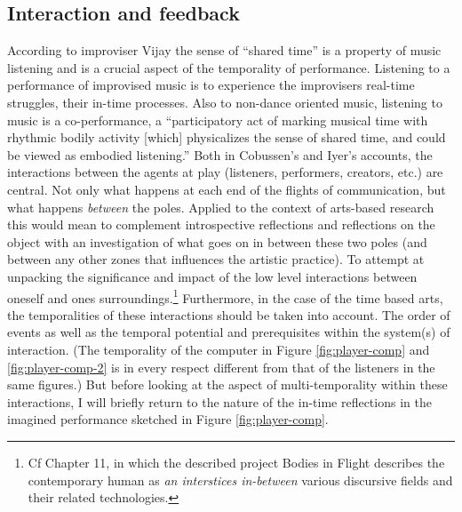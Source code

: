 \subsection*{Interaction and feedback}
\label{sec:interaction-feedback}

According to improviser Vijay \citeauthor{iyer08} the sense of ``shared time'' is a property of music listening and is a crucial aspect of the temporality of performance. Listening to a performance of improvised music is to experience the improvisers real-time struggles, their in-time processes. Also to non-dance oriented music, listening to music is a co-performance, a ``participatory act of marking musical time with rhythmic bodily activity [which] physicalizes the sense of shared time, and could be viewed as embodied listening.'' \parencite[276]{iyer08} Both in Cobussen's and Iyer's accounts, the interactions between the agents at play (listeners, performers, creators, etc.) are central. Not only what happens at each end of the flights of communication, but what happens \emph{between} the poles. Applied to the context of arts-based research this would mean to complement introspective reflections and reflections on the object with an investigation of what goes on in between these two poles (and between any other zones that influences the artistic practice). To attempt at unpacking the significance and impact of the low level interactions between oneself and ones surroundings.\footnote{Cf Chapter 11, in which the described project Bodies in Flight describes the contemporary human as \emph{an interstices in-between} various discursive fields and their related
technologies.} Furthermore, in the case of the time based arts, the temporalities of these interactions should be taken into account. The order of events as well as the temporal potential and prerequisites within the system(s) of interaction. (The temporality of the computer in Figure \ref{fig:player-comp} and \ref{fig:player-comp-2} is in every respect different from that of the listeners in the same figures.) But before looking at the aspect of multi-temporality within these interactions, I will briefly return to the nature of the in-time reflections in the imagined performance sketched in Figure \ref{fig:player-comp}.

